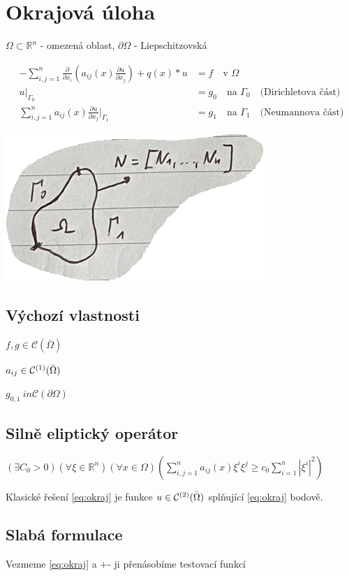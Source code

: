 \documentclass[../main.tex]{subfiles}
\begin{document}
\section{Okrajová úloha}
$\Omega\subset\mathbb{R}^n$ - omezená oblast, $\partial \Omega$ - Liepschitzovská

\begin{align}\label{eq:okraj}
    - \sum_{i,j = 1}^{n} \frac{\partial}{\partial x_i} \left ( a_{ij}(x) \frac{\partial u}{\partial x_j}\right ) + q(x)*u &= f \quad \text{v } \Omega
    \\ \label{eq:PP1}
    u|_{\Gamma_0} &= g_0 \quad \text{na } \Gamma_0 \quad \text{(Dirichletova část)}
    \\ \label{eq:PP2}
    \sum_{i,j=1}^{n}a_{ij} (x) \frac{\partial u}{\partial x_j} |_{\Gamma_1} &= g_1 \quad \text{na } \Gamma_1 \quad \text{(Neumannova část)}
\end{align}

\includegraphics{images/oblast.PNG}

\subsection{Výchozí vlastnosti}
$f, g \in \mathcal{C}(\bar{\Omega})$

$a_{ij} \in \continuous[\bar{\Omega}]{1}$

$g_{0,1} \ in \mathcal{C}(\partial\Omega)$

\subsection{Silně eliptický operátor}
$(\exists C_0 > 0)(\forall \xi \in \mathbb{R}^n) (\forall x \in \Omega) (\sum_{i,j =1}^{n} a_{ij}(x)\xi^i \xi^j \geq c_0 \sum_{i = 1}^{n}|\xi^i|^2)$


Klasické řešení \eqref{eq:okraj} je funkce $u\in\continuous[\bar{\Omega}]{2}$ splňující \eqref{eq:okraj} bodově. 

\subsection{Slabá formulace}
Vezmeme \eqref{eq:okraj} a +- ji přenásobíme testovací funkcí 
\end{document}
